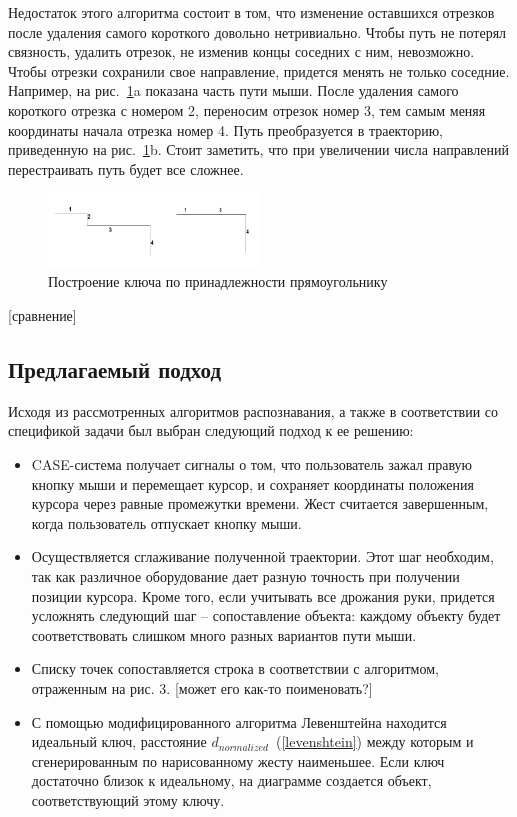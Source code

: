 \documentclass[a5paper]{article}
\begin{document}
Недостаток этого алгоритма состоит в том, что изменение оставшихся отрезков после удаления самого короткого довольно нетривиально. 
Чтобы путь не потерял связность, удалить отрезок, не изменив концы соседних с ним, невозможно. Чтобы отрезки сохранили свое направление, 
придется менять не только соседние. Например, на рис.~\ref{qt}a показана часть пути мыши. После удаления самого короткого отрезка с номером 2, 
переносим отрезок номер 3, тем самым меняя координаты начала отрезка номер 4. Путь преобразуется в траекторию, приведенную на рис.~\ref{qt}b.
Стоит заметить, что при увеличении числа направлений перестраивать путь будет все сложнее. 

\begin{figure} [ht]
  \begin{center}
    \includegraphics[width=0.5\textwidth, bb=0 0 544 390]{04-qt.png}
    \caption{Построение ключа по принадлежности прямоугольнику}
    \label{qt}
  \end{center}
\end{figure}

[сравнение]

\subsection{Предлагаемый подход}

Исходя из рассмотренных алгоритмов распознавания, а также в соответствии со спецификой задачи был выбран следующий подход к ее решению:

\begin{itemize}
  \item CASE-система получает сигналы о том, что пользователь зажал правую кнопку мыши и перемещает курсор, и сохраняет координаты положения курсора
через равные промежутки времени. Жест считается завершенным, когда пользователь отпускает кнопку мыши.
  \item Осуществляется сглаживание полученной траектории. Этот шаг необходим, так как различное оборудование дает разную точность при получении 
позиции курсора. Кроме того, если учитывать все дрожания руки, придется усложнять следующий шаг -- сопоставление объекта: каждому объекту
будет соответствовать слишком много разных вариантов пути мыши.
  \item Списку точек сопоставляется строка в соответствии с алгоритмом, отраженным на рис. 3. [может его как-то поименовать?]
  \item С помощью модифицированного алгоритма Левенштейна находится идеальный ключ, расстояние $d_{normalized}$~(\ref{levenshtein}) между которым и 
сгенерированным по нарисованному жесту наименьшее. Если ключ достаточно близок к идеальному, на диаграмме создается объект, соответствующий этому ключу.
\end{itemize}
\end{document}
